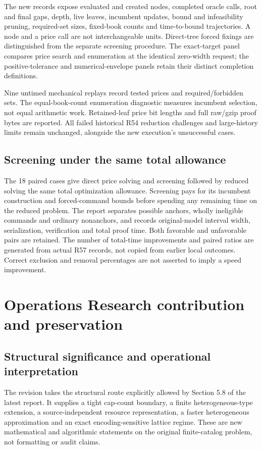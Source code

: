 The new records expose evaluated and created nodes, completed oracle calls, root and final gaps, depth, live leaves, incumbent updates, bound and infeasibility pruning, required-set sizes, fixed-book counts and time-to-bound trajectories. A node and a price call are not interchangeable units. Direct-tree forced fixings are distinguished from the separate screening procedure. The exact-target panel compares price search and enumeration at the identical zero-width request; the positive-tolerance and numerical-envelope panels retain their distinct completion definitions.

Nine untimed mechanical replays record tested prices and required/forbidden sets. The equal-book-count enumeration diagnostic measures incumbent selection, not equal arithmetic work. Retained-leaf price bit lengths and full raw/gzip proof bytes are reported. All failed historical R54 reduction challenges and large-history limits remain unchanged, alongside the new execution's unsuccessful cases.

\subsection{Screening under the same total allowance}
The 18 paired cases give direct price solving and screening followed by reduced solving the same total optimization allowance. Screening pays for its incumbent construction and forced-command bounds before spending any remaining time on the reduced problem. The report separates possible anchors, wholly ineligible commands and ordinary nonanchors, and records original-model interval width, serialization, verification and total proof time. Both favorable and unfavorable pairs are retained. The number of total-time improvements and paired ratios are generated from actual R57 records, not copied from earlier local outcomes. Correct exclusion and removal percentages are not asserted to imply a speed improvement.

\section{Operations Research contribution and preservation}
\subsection{Structural significance and operational interpretation}
The revision takes the structural route explicitly allowed by Section 5.8 of the latest report. It supplies a tight cap-count boundary, a finite heterogeneous-type extension, a source-independent resource representation, a faster heterogeneous approximation and an exact encoding-sensitive lattice regime. These are new mathematical and algorithmic statements on the original finite-catalog problem, not formatting or audit claims.

